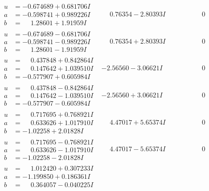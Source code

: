\documentclass[1p]{elsarticle_modified}
\theoremstyle{definition}
\begin{document}
$$\begin{array}{c|c|c}
\begin{aligned}
u &= -0.674689 + 0.681706 I \\
a &= -0.598741 + 0.989226 I \\
b &= \phantom{-}1.28601 + 1.91959 I\end{aligned}
 & \phantom{-}0.76354 - 2.80393 I & \phantom{-0.000000 } 0 \\ \hline\begin{aligned}
u &= -0.674689 - 0.681706 I \\
a &= -0.598741 - 0.989226 I \\
b &= \phantom{-}1.28601 - 1.91959 I\end{aligned}
 & \phantom{-}0.76354 + 2.80393 I & \phantom{-0.000000 } 0 \\ \hline\begin{aligned}
u &= \phantom{-}0.437848 + 0.842864 I \\
a &= \phantom{-}0.147642 + 1.039510 I \\
b &= -0.577907 + 0.605984 I\end{aligned}
 & -2.56560 - 3.06621 I & \phantom{-0.000000 } 0 \\ \hline\begin{aligned}
u &= \phantom{-}0.437848 - 0.842864 I \\
a &= \phantom{-}0.147642 - 1.039510 I \\
b &= -0.577907 - 0.605984 I\end{aligned}
 & -2.56560 + 3.06621 I & \phantom{-0.000000 } 0 \\ \hline\begin{aligned}
u &= \phantom{-}0.717695 + 0.768921 I \\
a &= \phantom{-}0.633626 + 1.017910 I \\
b &= -1.02258 + 2.01828 I\end{aligned}
 & \phantom{-}4.47017 + 5.65374 I & \phantom{-0.000000 } 0 \\ \hline\begin{aligned}
u &= \phantom{-}0.717695 - 0.768921 I \\
a &= \phantom{-}0.633626 - 1.017910 I \\
b &= -1.02258 - 2.01828 I\end{aligned}
 & \phantom{-}4.47017 - 5.65374 I & \phantom{-0.000000 } 0 \\ \hline\begin{aligned}
u &= \phantom{-}1.012420 + 0.307233 I \\
a &= -1.199850 + 0.186361 I \\
b &= \phantom{-}0.364057 - 0.040225 I\end{aligned}

\end{array}$$
\end{document}
